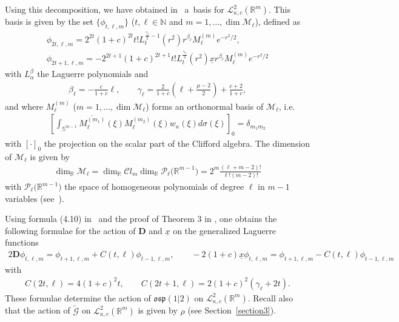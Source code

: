 \documentclass[11pt]{article}
\numberwithin{equation}{section}
\numberwithin{theorem}{section}
\numberwithin{proposition}{section}
\numberwithin{lemma}{section}
\numberwithin{corollary}{section}
\numberwithin{definition}{section}
\numberwithin{example}{section}
\numberwithin{remark}{section}
\numberwithin{note}{section}
\theoremstyle{remark}
\newcommand{\mR}{\mathbb{R}}
\newcommand{\mN}{\mathbb{N}}
\newcommand{\mS}{\mathbb{S}}
\newcommand{\cM}{\mathcal{M}}
\newcommand{\cP}{\mathcal{P}}
\newcommand{\cC}{\mathcal{C}}
\newcommand{\cG}{\mathcal{G}}
\newcommand{\cL}{\mathcal{L}}
\newcommand{\dD}{\textbf{D}}
\newcommand{\ux}{\underline{x}}
\def\k{{\kappa}}
\begin{document}
Using this decomposition, we have obtained in~\cite{H12} a~basis for $\cL^{2}_{\k,c}(\mR^{m})$.
This basis is given by the set $\{\phi_{t,\ell,m}\}$ ($t,\ell\in\mN$ and $m=1,\ldots,\dim
\cM_{\ell}$), def\/ined as
\begin{gather*}
\phi_{2t,\ell,m} = 2^{2t} (1+c)^{2t} t! L_{t}^{\frac{\gamma_{\ell}}{2} -1}(r^{2})r^{\beta_{\ell}}
M_{\ell}^{(m)} e^{-r^{2}/2},\\
\phi_{2t+1,\ell,m} = - 2^{2t+1} (1+c)^{2t+1} t! L_{t}^{\frac{\gamma_{\ell}}{2}}(r^{2}) \ux
r^{\beta_{\ell}} M_{\ell}^{(m)} e^{-r^{2}/2}
\end{gather*}
with $L_{\alpha}^{\beta}$ the Laguerre polynomials and
\begin{gather*}
\beta_{\ell} = - \frac{c}{1+c}\ell,\qquad
\gamma_{\ell} = \frac{2}{1+c}\left( \ell + \frac{\mu-2}{2}\right) + \frac{c+2}{1+c},
\end{gather*}
and where $M_{\ell}^{(m)}$ ($m=1,\ldots,\dim\cM_{\ell}$) forms an orthonormal basis of
$\cM_{\ell}$, i.e.
\begin{gather*}
\left[\int_{\mS^{m-1}}\overline{M_{\ell}^{(m_{1})}}(\xi)M_{\ell}^{(m_{2})}(\xi)w_{\k}(\xi)
d\sigma(\xi)\right]_{0}=\delta_{m_{1}m_{2}}
\end{gather*}
with $[\cdot]_0$ the projection on the scalar part of the Clif\/ford algebra.
The dimension of $\cM_{\ell}$ is given by
\begin{gather*}
\dim_{\mR}{\cM_{\ell}} = \dim_{\mR}{\cC l_{m}} \dim_{\mR}{\cP_{\ell}\big(\mR^{m-1}\big)}
=2^{m} \frac{(\ell +m-2)!}{\ell! (m-2)!}
\end{gather*}
with $\cP_{\ell}\big(\mR^{m-1}\big)$ the space of homogeneous polynomials of degree $\ell$ in $m-1$
variables (see~\cite{MR1169463}).

Using formula (4.10) in~\cite{H12} and the proof of Theorem 3 in \cite{H12}, one obtains the
following formulae for the action of $\dD$ and $\ux$ on the generalized Laguerre functions
\begin{gather}
2 \dD \phi_{t,\ell,m}\! = \phi_{t+1,\ell,m}\! + C(t,\ell) \phi_{t-1,\ell,m},\qquad
-2(1+c) \ux \phi_{t,\ell,m}\! = \phi_{t+1,\ell,m}\! - C(t,\ell) \phi_{t-1,\ell,m}\!\!\!\!\label{ActionOnBasis}
\end{gather}
with
\begin{gather*}
C(2t, \ell)= 4 (1+c)^{2} t,\qquad
C(2t+1, \ell)= 2 (1+c)^{2}(\gamma_{\ell}+ 2t).
\end{gather*}
These formulae determine the action of $\mathfrak{osp}(1|2)$ on $\cL^{2}_{\k,c}(\mR^{m})$.
Recall also that the action of $\widetilde{\cG}$ on $\cL^{2}_{\k,c}(\mR^{m})$ is given by $\rho$
(see Section~\ref{section3}).
\end{document}
